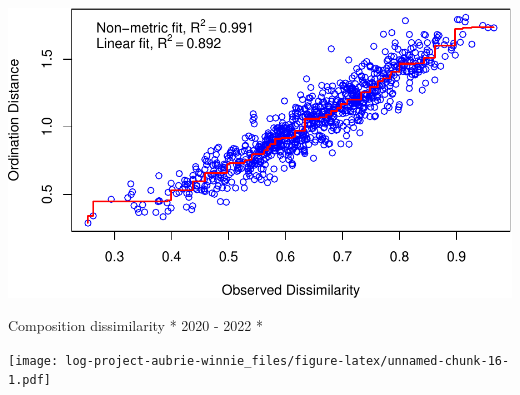 \documentclass[
]{article}
\begin{document}
\includegraphics{log-project-aubrie-winnie_files/figure-latex/unnamed-chunk-14-1.pdf}

Composition dissimilarity * 2020 - 2022 *

\texttt{[image: log-project-aubrie-winnie\_files/figure-latex/unnamed-chunk-16-1.pdf]}
\end{document}
